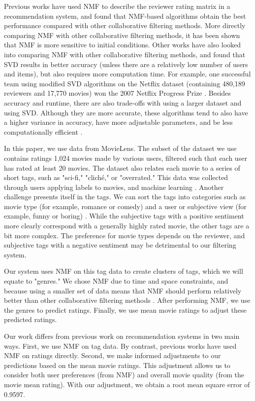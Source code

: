 \documentclass[letterpaper, 10 pt, conference]{ieeeconf}  %
\begin{document}
Previous works \cite{nmfratings} have used NMF to describe the reviewer rating matrix in a recommendation system, and found that NMF-based algorithms obtain the best performance compared with other collaborative filtering methods. More directly comparing NMF with other collaborative filtering methods, it has been shown \cite{nmfratings} that NMF is more sensitive to initial conditions. Other works \cite{cfcompare} have also looked into comparing NMF with other collaborative filtering methods, and found that SVD results in better accuracy (unless there are a relatively low number of users and items), but also requires more computation time. For example, one successful team using modified SVD algorithms on the Netflix dataset (containing 480,189 reviewers and 17,770 movies) won the 2007 Netflix Progress Prize \cite{netflix}. Besides accuracy and runtime, there are also trade-offs with using a larger dataset and using SVD. Although they are more accurate, these algorithms tend to also have a higher variance in accuracy, have more adjustable parameters, and be less computationally efficient \cite{cfcompare}.

In this paper, we use data from MovieLens. The subset of the dataset we use contains ratings 1,024 movies made by various users, filtered such that each user has rated at least 20 movies.
The dataset also relates each movie to a series of short tags, such as "sci-fi," "cliché," or "overrated." This data was collected through users applying labels to movies, and machine learning \cite{lenskitdata}. Another challenge presents itself in the tags. We can sort the tags into categories such as movie type (for example, romance or comedy) and a user or subjective view (for example, funny or boring) \cite{tags}. While the subjective tags with a positive sentiment more clearly correspond with a generally highly rated movie, the other tags are a bit more complex. The preference for movie types depends on the reviewer, and subjective tags with a negative sentiment may be detrimental to our filtering system.


Our system uses NMF on this tag data to create clusters of tags, which we will equate to "genres." We chose NMF due to time and space constraints, and because using a smaller set of data means that NMF should perform relatively better than other collaborative filtering methods \cite{cfcompare}. After performing NMF, we use the genres to predict ratings. Finally, we use mean movie ratings to adjust these predicted ratings.

Our work differs from previous work on recommendation systems in two main ways. First, we use NMF on tag data. By contrast, previous works have used NMF on ratings directly. Second, we make informed adjustments to our predictions based on the mean movie ratings. This adjustment allows us to consider both user preferences (from NMF) and overall movie quality (from the movie mean rating). With our adjustment, we obtain a root mean square error of 0.9597.
\end{document}

